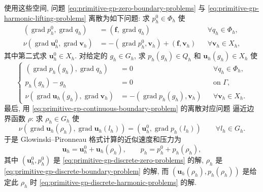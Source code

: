 使用这些空间, 问题 \eqref{eq:primitive-gp-zero-boundary-problems} 与
\eqref{eq:primitive-gp-harmonic-lifting-problems} 离散为如下问题:
求 $p_h^0\in\Phi_h$ 使
\begin{equation}\label{eq:primitive-gp-discrete-zero-problems}
\begin{aligned}
(\operatorname{grad}p_h^0,\operatorname{grad}q_h)
&=(\mathbf f,\operatorname{grad}q_h)
&&\forall q_h\in\Phi_h,\\
\nu(\operatorname{grad}\mathbf u_h^0,\operatorname{grad}\mathbf v_h)
&=-(\operatorname{grad}p_h^0,\mathbf v_h)+(\mathbf f,\mathbf v_h)
&&\forall\mathbf v_h\in X_h,
\end{aligned}
\end{equation}
其中第二式求 $\mathbf u_h^0\in X_h$. 对给定的 $g_h\in G_h$, 求
$p_h(g_h)\in Q_h$ 和 $\mathbf u_h(g_h)\in X_h$ 使
\begin{equation}\label{eq:primitive-gp-discrete-harmonic-problems}
\left\{
\begin{aligned}
(\operatorname{grad}p_h(g_h),\operatorname{grad}q_h)&=0
&&\forall q_h\in\Phi_h,\\
p_h(g_h)-g_h&=0&&\text{on }\Gamma,\\
\nu(\operatorname{grad}\mathbf u_h(g_h),\operatorname{grad}\mathbf v_h)
&=-(\operatorname{grad}p_h(g_h),\mathbf v_h)
&&\forall\mathbf v_h\in X_h.
\end{aligned}
\right.
\end{equation}
最后, 用 \eqref{eq:primitive-gp-continuous-boundary-problem} 的离散对应问题
逼近边界函数 $\rho$: 求 $\rho_h\in G_h$ 使
\begin{equation}\label{eq:primitive-gp-discrete-boundary-problem}
\nu(\operatorname{grad}\mathbf u_h(\rho_h),
\operatorname{grad}\mathbf u_h(l_h))
=(\mathbf u_h^0,\operatorname{grad}p_h(l_h))
\qquad\forall l_h\in G_h.
\end{equation}
于是 Glowinski--Pironneau 格式计算的近似速度和压力为
\begin{equation}\label{eq:primitive-gp-discrete-solution}
\mathbf u_h=\mathbf u_h^0+\mathbf u_h(\rho_h),
\qquad p_h=p_h^0+p_h(\rho_h),
\end{equation}
其中 $(\mathbf u_h^0,p_h^0)$ 是
\eqref{eq:primitive-gp-discrete-zero-problems} 的解, $\rho_h$ 是
\eqref{eq:primitive-gp-discrete-boundary-problem} 的解, 而
$(\mathbf u_h(\rho_h),p_h(\rho_h))$ 是给定此 $\rho_h$ 时
\eqref{eq:primitive-gp-discrete-harmonic-problems} 的解.
